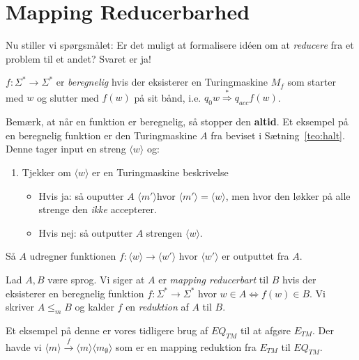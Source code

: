 \section{Mapping Reducerbarhed}%
\label{sec:label}

Nu stiller vi spørgsmålet: Er det muligt at formalisere idéen om at \textit{reducere} fra et problem til et andet? Svaret er ja!

\begin{definition}
	$f : \Sigma^{*} \rightarrow \Sigma^{*}$ er \textit{beregnelig} hvis der eksisterer en Turingmaskine $M_{f}$ som starter med $w$ og slutter med $f(w)$ på sit bånd, i.e. $q_{0}w \stackrel{*}{\Rightarrow} q_{acc}f(w)$.
\end{definition}

Bemærk, at når en funktion er beregnelig, så stopper den \textbf{altid}. Et eksempel på en beregnelig funktion er den Turingmaskine $A$ fra beviset i Sætning~\ref{teo:halt}. Denne tager input en streng \(\langle w \rangle \) og:
\begin{enumerate}
	\item Tjekker om \(\langle w \rangle \) er en Turingmaskine beskrivelse
	      \begin{itemize}
		      \item Hvis ja: så ouputter $A$  \(\langle m' \rangle \)hvor \(\langle m' \rangle =  \langle w \rangle \), men hvor den løkker på alle strenge den \textit{ikke} accepterer.
		      \item Hvis nej: så outputter $A$ strengen \(\langle w \rangle \).
	      \end{itemize}
\end{enumerate}

Så $A$ udregner funktionen $f : \langle w \rangle  \longrightarrow \langle w' \rangle $ hvor $\langle w' \rangle $ er outputtet fra $A$.

\begin{definition}
	Lad $A,B$ være sprog. Vi siger at $A$ er \textit{mapping reducerbart} til $B$ hvis der eksisterer en beregnelig funktion $f : \Sigma^{*} \longrightarrow \Sigma^{*}$ hvor $w \in A \iff f(w) \in B$. Vi skriver $A \le_{m} B$ og kalder $f$ en \textit{reduktion} af $A$ til $B$.
\end{definition}

Et eksempel på denne er vores tidligere brug af $EQ_{TM}$ til at afgøre $E_{TM}$. Der havde vi \(\langle m \rangle \stackrel{f}{\longrightarrow} \langle m \rangle \langle m_{\emptyset} \rangle \) som er en mapping reduktion fra $E_{TM}$ til $EQ_{TM}$.

